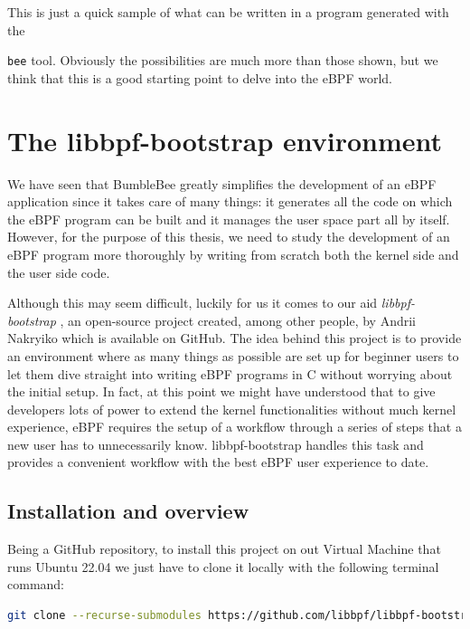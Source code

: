 This is just a quick sample of what can be written in a program generated with the \raggedright\colorbox{backcolour}{\lstinline[style=commandline, language=bash]|bee|} tool.
Obviously the possibilities are much more than those shown, but we think that this is a good starting point to delve into the eBPF world.

\section{The libbpf-bootstrap environment}

We have seen that BumbleBee greatly simplifies the development of an eBPF application since it takes care of many things: it generates all the code on which the eBPF program can be built and it manages the user space part all by itself.
However, for the purpose of this thesis, we need to study the development of an eBPF program more thoroughly by writing from scratch both the kernel side and the user side code.

Although this may seem difficult, luckily for us it comes to our aid \textit{libbpf-bootstrap} \cite{libbpfbootstrapGithubRepo}, an open-source project created, among other people, by Andrii Nakryiko which is available on GitHub.
The idea behind this project is to provide an environment where as many things as possible are set up for beginner users to let them dive straight into writing eBPF programs in C without worrying about the initial setup.
In fact, at this point we might have understood that to give developers lots of power to extend the kernel functionalities without much kernel experience, eBPF requires the setup of a workflow through a series of steps that a new user has to unnecessarily know.
libbpf-bootstrap handles this task and provides a convenient workflow with the best eBPF user experience to date.

\subsection{Installation and overview}

Being a GitHub repository, to install this project on out Virtual Machine that runs Ubuntu 22.04 we just have to clone it locally with the following terminal command:

\begin{lstlisting}[style=commandline, language=bash, caption={Clone libbpf-bootstrap command.}]
	git clone --recurse-submodules https://github.com/libbpf/libbpf-bootstrap
\end{lstlisting}

